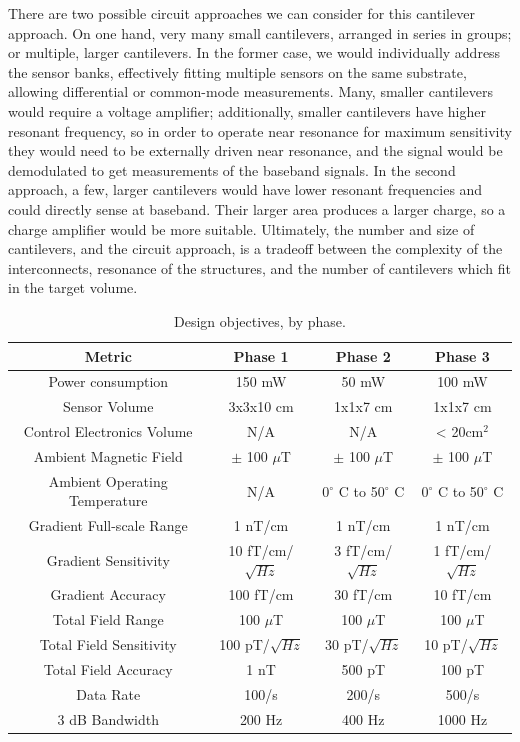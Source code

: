 There are two possible circuit approaches we can consider for this cantilever approach. On one hand, very many small cantilevers, arranged in series in groups; or multiple, larger cantilevers. In the former case, we would individually address the sensor banks, effectively fitting multiple sensors on the same substrate, allowing differential or common-mode measurements. Many, smaller cantilevers would require a voltage amplifier; additionally, smaller cantilevers have higher resonant frequency, so in order to operate near resonance for maximum sensitivity they would need to be externally driven near resonance, and the signal would be demodulated to get measurements of the baseband signals. In the second approach, a few, larger cantilevers would have lower resonant frequencies and could directly sense at baseband. Their larger area produces a larger charge, so a charge amplifier would be more suitable. Ultimately, the number and size of cantilevers, and the circuit approach, is a tradeoff between the complexity of the interconnects, resonance of the structures, and the number of cantilevers which fit in the target volume.

\begin{table}[h!]
\centering
  \begin{tabular}{|c||c|c|c|}
    \hline
    Metric & Phase 1 & Phase 2 & Phase 3 \\
    \hline
    \hline
    Power consumption & 150 mW & 50 mW & 100 mW \\
    \hline
    Sensor Volume & 3x3x10 cm & 1x1x7 cm & 1x1x7 cm \\
    \hline
    Control Electronics Volume  & N/A & N/A & < 20cm$^2$ \\
    \hline
    Ambient Magnetic Field & $\pm$ 100 $\mu$T & $\pm$ 100 $\mu$T & $\pm$ 100 $\mu$T \\
    \hline
    Ambient Operating Temperature & N/A & 0$^{\circ}$ C to 50$^{\circ}$ C & 0$^{\circ}$ C to 50$^{\circ}$ C \\
    \hline
    Gradient Full-scale Range & 1 nT/cm & 1 nT/cm & 1 nT/cm \\
    \hline
    Gradient Sensitivity & 10 fT/cm/$\sqrt{Hz}$ & 3 fT/cm/$\sqrt{Hz}$  & 1 fT/cm/$\sqrt{Hz}$ \\
    \hline
    Gradient Accuracy & 100 fT/cm & 30 fT/cm & 10 fT/cm \\
    \hline
    Total Field Range & 100 $\mu$T & 100 $\mu$T & 100 $\mu$T \\
    \hline
    Total Field Sensitivity & 100 pT/$\sqrt{Hz}$ & 30 pT/$\sqrt{Hz}$  &  10 pT/$\sqrt{Hz}$ \\
    \hline
    Total Field Accuracy & 1 nT & 500 pT & 100 pT \\
    \hline
    Data Rate & 100/s & 200/s & 500/s \\
    \hline
    3 dB Bandwidth & 200 Hz & 400 Hz & 1000 Hz\\
    \hline
  \end{tabular}
\caption{Design objectives, by phase.}
\label{table:obj}
\end{table}

